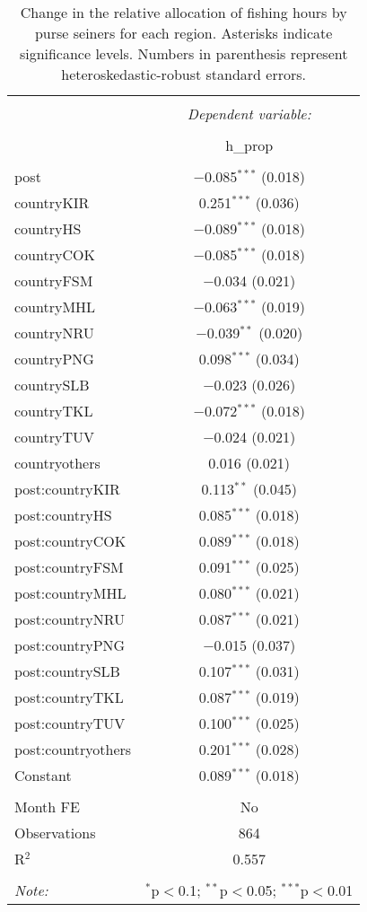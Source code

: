 \documentclass[12pt,]{article}
\begin{document}
\begin{table}[!htbp] \centering 
  \caption{\label{tab:disp_mod}Change in the relative allocation of fishing hours by purse seiners for each region. Asterisks indicate significance levels. Numbers in parenthesis represent heteroskedastic-robust standard errors.} 
  \label{} 
\begin{tabular}{@{\extracolsep{5pt}}lc} 
\\[-1.8ex]\hline 
\hline \\[-1.8ex] 
 & \multicolumn{1}{c}{\textit{Dependent variable:}} \\ 
\cline{2-2} 
\\[-1.8ex] & h\_prop \\ 
\hline \\[-1.8ex] 
 post & $-$0.085$^{***}$ (0.018) \\ 
  countryKIR & 0.251$^{***}$ (0.036) \\ 
  countryHS & $-$0.089$^{***}$ (0.018) \\ 
  countryCOK & $-$0.085$^{***}$ (0.018) \\ 
  countryFSM & $-$0.034 (0.021) \\ 
  countryMHL & $-$0.063$^{***}$ (0.019) \\ 
  countryNRU & $-$0.039$^{**}$ (0.020) \\ 
  countryPNG & 0.098$^{***}$ (0.034) \\ 
  countrySLB & $-$0.023 (0.026) \\ 
  countryTKL & $-$0.072$^{***}$ (0.018) \\ 
  countryTUV & $-$0.024 (0.021) \\ 
  countryothers & 0.016 (0.021) \\ 
  post:countryKIR & 0.113$^{**}$ (0.045) \\ 
  post:countryHS & 0.085$^{***}$ (0.018) \\ 
  post:countryCOK & 0.089$^{***}$ (0.018) \\ 
  post:countryFSM & 0.091$^{***}$ (0.025) \\ 
  post:countryMHL & 0.080$^{***}$ (0.021) \\ 
  post:countryNRU & 0.087$^{***}$ (0.021) \\ 
  post:countryPNG & $-$0.015 (0.037) \\ 
  post:countrySLB & 0.107$^{***}$ (0.031) \\ 
  post:countryTKL & 0.087$^{***}$ (0.019) \\ 
  post:countryTUV & 0.100$^{***}$ (0.025) \\ 
  post:countryothers & 0.201$^{***}$ (0.028) \\ 
  Constant & 0.089$^{***}$ (0.018) \\ 
 \hline \\[-1.8ex] 
Month FE & No \\ 
Observations & 864 \\ 
R$^{2}$ & 0.557 \\ 
\hline 
\hline \\[-1.8ex] 
\textit{Note:}  & \multicolumn{1}{r}{$^{*}$p$<$0.1; $^{**}$p$<$0.05; $^{***}$p$<$0.01} \\ 
\end{tabular} 
\end{table}
\end{document}
